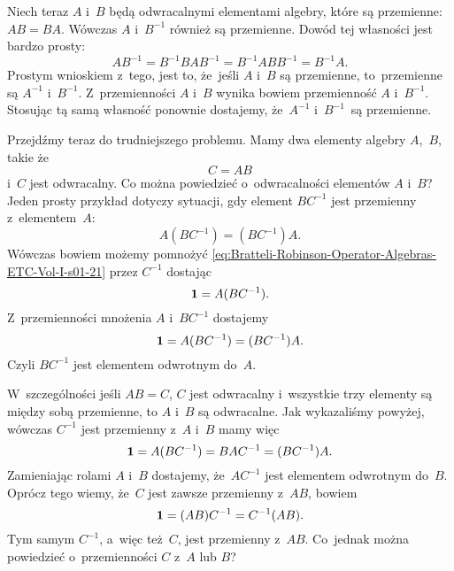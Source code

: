 \documentclass[a4paper,11pt]{article}
\numberwithin{equation}{section}
\begin{document}
Niech teraz $A$ i~$B$ będą odwracalnymi elementami algebry, które są
przemienne: $A B = B A$. Wówczas $A$ i~$B^{ -1 }$ również są
przemienne. Dowód tej własności jest bardzo prosty:
\begin{equation}
  \label{eq:Bratteli-Robinson-Operator-Algebras-ETC-Vol-I-s01-20}
  A B^{ -1 } = B^{ -1 } B A B^{ -1 } = B^{ -1 } A B B^{ -1 } = B^{ -1 } A.
\end{equation}
Prostym wnioskiem z~tego, jest to, że~jeśli $A$ i~$B$ są przemienne,
to~przemienne są $A^{ -1 }$ i~$B^{ -1 }$. Z~przemienności $A$ i~$B$ wynika
bowiem przemienność $A$ i~$B^{ -1 }$. Stosując tą samą własność ponownie
dostajemy, że~$A^{ -1 }$ i~$B^{ -1 }$~są przemienne.

Przejdźmy teraz do trudniejszego problemu. Mamy dwa elementy algebry
$A$,~$B$, takie że
\begin{equation}
  \label{eq:Bratteli-Robinson-Operator-Algebras-ETC-Vol-I-s01-21}
  C = A B
\end{equation}
i~$C$ jest odwracalny. Co można powiedzieć o~odwracalności elementów $A$
i~$B$? Jeden prosty przykład dotyczy sytuacji, gdy element $B C^{ -1 }$ jest
przemienny z~elementem~$A$:
\begin{equation}
  \label{eq:Bratteli-Robinson-Operator-Algebras-ETC-Vol-I-s01-22}
  A ( B C^{ -1 } ) = ( B C^{ -1 } ) A.
\end{equation}
Wówczas bowiem możemy pomnożyć
\eqref{eq:Bratteli-Robinson-Operator-Algebras-ETC-Vol-I-s01-21} przez
$C^{ -1 }$ dostając
\begin{equation}
  \label{eq:Bratteli-Robinson-Operator-Algebras-ETC-Vol-I-s01-23}
  \mathbf{1} = A ( B C^{ -1 } ).
\end{equation}
Z~przemienności mnożenia $A$ i~$B C^{ -1 }$ dostajemy
\begin{equation}
  \label{eq:Bratteli-Robinson-Operator-Algebras-ETC-Vol-I-s01-24}
  \mathbf{1} = A ( B C^{ -1 } ) = ( B C^{ -1 } ) A.
\end{equation}
Czyli $B C^{ -1 }$ jest elementem odwrotnym do~$A$.

W~szczególności jeśli $A B = C$, $C$ jest odwracalny i~wszystkie trzy
elementy są między sobą przemienne, to $A$ i~$B$ są odwracalne. Jak
wykazaliśmy powyżej, wówczas $C^{ -1 }$ jest przemienny z~$A$ i~$B$ mamy więc
\begin{equation}
  \label{eq:Bratteli-Robinson-Operator-Algebras-ETC-Vol-I-s01-25}
  \mathbf{1} = A ( B C^{ -1 } ) = B A C^{ -1 } = ( B C^{ -1 } ) A.
\end{equation}
Zamieniając rolami $A$ i~$B$ dostajemy, że~$A C^{ -1 }$ jest elementem
odwrotnym do~$B$. Oprócz tego wiemy, że~$C$ jest zawsze przemienny z~$A B$,
bowiem
\begin{equation}
  \label{eq:Bratteli-Robinson-Operator-Algebras-ETC-Vol-I-s01-26}
  \mathbf{1} = ( A B ) C^{ -1 } = C^{ -1 } ( A B ).
\end{equation}
Tym samym $C^{ -1 }$, a~więc też~$C$, jest przemienny z~$A B$. Co~jednak
można powiedzieć o~przemienności $C$ z~$A$ lub $B$?
\end{document}
